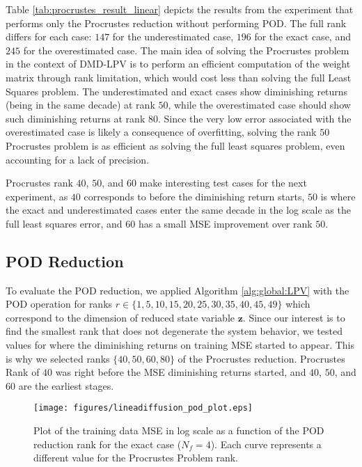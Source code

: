 Table \ref{tab:procrustes_result_linear} depicts the results from the experiment that performs only the Procrustes reduction without performing POD.
%
The full rank differs for each case: $147$ for the underestimated case, $196$ for the exact case, and $245$ for the overestimated case.
% 
The main idea of solving the Procrustes problem in the context of DMD-LPV is to perform an efficient computation of the weight matrix through rank limitation, which would cost less than solving the full Least Squares problem.
%
The underestimated and exact cases show diminishing returns (being in the same decade) at rank $50$, while the overestimated case should show such diminishing returns at rank $80$.
%
Since the very low error associated with the overestimated case is likely a consequence of overfitting, solving the rank $50$ Procrustes problem is as efficient as solving the full least squares problem, even accounting for a lack of precision.

Procrustes rank $40$, $50$, and $60$ make interesting test cases for the next experiment, as $40$ corresponds to before the diminishing return starts, $50$ is where the exact and underestimated cases enter the same decade  in the log scale as the full least squares error, and $60$ has a small MSE improvement over rank $50$.



\subsection{POD Reduction}

To evaluate the POD reduction, we applied Algorithm \ref{alg:global:LPV} with the POD operation for ranks $r \in\{1,5,10,15,20,25,30,35,40,45,49\}$ which correspond to the dimension of reduced state variable $\mathbf{z}$.
%
Since our interest is to find the smallest rank that does not degenerate the system behavior, we tested values for where the diminishing returns on training MSE started to appear.
%
This is why we selected ranks $\{40,50,60,80\}$ of the Procrustes reduction.
%
Procrustes Rank of $40$ was right before the MSE diminishing returns started, and $40$, $50$, and $60$ are the earliest stages.

\begin{figure}
    \centering
    \texttt{[image: figures/lineadiffusion\_pod\_plot.eps]}
    \caption{Plot of the training data MSE in log scale as a function of the POD reduction rank for the exact case  ($N_f=4$). Each curve represents a different value for the Procrustes Problem rank.}
    \label{fig:pod_error_plot}
\end{figure}



